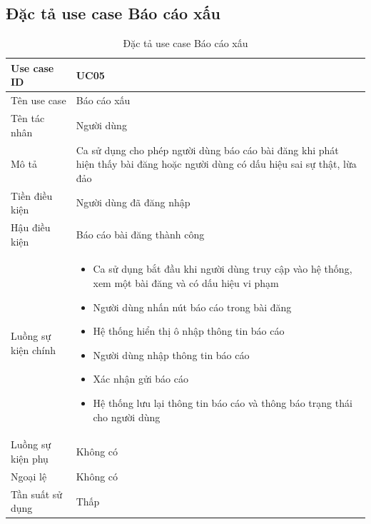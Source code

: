 \documentclass[../DoAn.tex]{subfiles}
\begin{document}
\subsection{Đặc tả use case Báo cáo xấu}
\hfill
\begin{table}[H]
\begin{tabular}{|p{3cm}|p{12cm}|}
\hline
Use case ID         & UC05                                                                                                               \\ \hline
Tên use case        & Báo cáo xấu                                                                                                   \\ \hline
Tên tác nhân        & Người dùng                                                                                                         \\ \hline
Mô tả               & Ca sử dụng cho phép người dùng báo cáo bài đăng khi phát hiện thấy bài đăng hoặc người dùng có dấu hiệu sai sự thật, lừa đảo\\ \hline
Tiền điều kiện      & Người dùng đã đăng nhập                                      \\ \hline
Hậu điều kiện       & Báo cáo bài đăng thành công                                  \\ \hline
Luồng sự kiện chính & 
\begin{itemize}
    \item Ca sử dụng bắt đầu khi người dùng truy cập vào hệ thống, xem một bài đăng và có dấu hiệu vi phạm
    \item Người dùng nhấn nút báo cáo trong bài đăng
    \item Hệ thống hiển thị ô nhập thông tin báo cáo
    \item Người dùng nhập thông tin báo cáo
    \item Xác nhận gửi báo cáo
    \item Hệ thống lưu lại thông tin báo cáo và thông báo trạng thái cho người dùng
\end{itemize} \\\hline
Luồng sự kiện phụ   & Không có\\ \hline
Ngoại lệ            & Không có                                                                                            \\ \hline
Tần suất sử dụng    & Thấp                                                                                                                \\ \hline
\end{tabular}
\caption{Đặc tả use case Báo cáo xấu}
\label{tab:my-table}
\end{table}
\newpage
\end{document}
